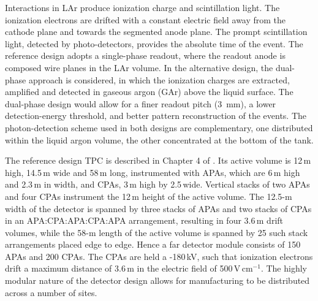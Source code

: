 Interactions in LAr produce ionization charge and scintillation light.
The ionization electrons are drifted with a constant electric field away from the cathode
plane and towards the segmented anode plane. 
The prompt scintillation light,
detected by photo-detectors, provides the absolute time of the event.
The reference design adopts a single-phase readout, where the readout anode is composed wire planes in the LAr volume. 
In the alternative design, the  dual-phase approach is considered, in which the 
ionization charges are extracted, amplified and detected in gaseous argon (GAr) above the liquid surface. 
The dual-phase design would allow for a finer readout pitch (3~mm), 
a lower detection-energy threshold, and better pattern reconstruction of the events.
The photon-detection scheme used in both designs are complementary, one distributed
within the liquid argon volume, the other concentrated at the bottom of the tank.

The  reference design TPC is described in Chapter 4 of \voldune. 
Its active volume is 12\,m high, 14.5\,m wide and 
58\,m long, instrumented with APAs, 
which are 6\,m high and 2.3\,m in width, and CPAs, 3\,m high by 2.5\,wide. Vertical stacks of
two APAs and four CPAs %
instrument 
the 12\,m height of the active volume. The 12.5-m width of the detector is 
spanned by three stacks of APAs and two stacks of CPAs in an APA:CPA:APA:CPA:APA
arrangement, resulting in four 3.6\,m drift volumes, while the 58-m length of the active volume
is spanned by 25 such stack arrangements placed edge to edge. Hence a  
far detector module consists of 150 APAs and 200 CPAs. The CPAs are held a -180\,kV, such that 
ionization electrons drift a maximum distance of 3.6\,m in the electric field of 500\,V\,cm$^{-1}$.
The highly modular nature of the detector design allows for manufacturing to be distributed across a number of sites.

